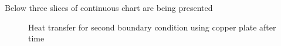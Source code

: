 \documentclass[onecolumn]{article}
\begin{document}
Below three slices of continuous chart are being presented

\begin{figure}[H]
\noindent{}
\caption{Heat transfer for second boundary condition using copper plate after time}
\label{fig:plate}
\end{figure}
\end{document}
